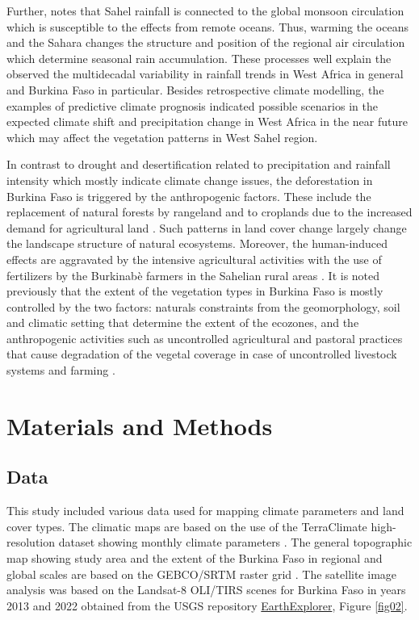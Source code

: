 \documentclass[atmosphere,article,submit,pdftex,moreauthors]{Definitions/mdpi}
\begin{document}
Further, \cite{Biasutti} notes that Sahel rainfall is connected to the global monsoon circulation which is susceptible to the effects from remote oceans. Thus, warming the oceans and the Sahara changes the structure and position of the regional air circulation which determine seasonal rain accumulation. These processes well explain the observed the multidecadal variability in rainfall trends in West Africa in general and Burkina Faso in particular. Besides retrospective climate modelling, the examples of predictive climate prognosis \cite{Gaetani} indicated possible scenarios in the expected climate shift and precipitation change in West Africa in the near future which may affect the vegetation patterns in West Sahel region. 

In contrast to drought and desertification related to precipitation and rainfall intensity which mostly indicate climate change issues, the deforestation in Burkina Faso is triggered by the anthropogenic factors. These include the replacement of natural forests by rangeland and to croplands due to the increased demand for agricultural land \cite{ETONGO201551}. Such patterns in land cover change largely change the landscape structure of natural ecosystems. Moreover, the human-induced effects are aggravated by the intensive agricultural activities with the use of fertilizers by the Burkinabè farmers in the Sahelian rural areas \cite{agronomy11122431}. It is noted previously that the extent of the vegetation types in Burkina Faso is mostly controlled by the two factors: naturals constraints from the geomorphology, soil and climatic setting that determine the extent of the ecozones, and the anthropogenic activities such as uncontrolled agricultural and pastoral practices that cause degradation of the vegetal coverage in case of uncontrolled livestock systems and farming \cite{Bandre}. 

\section{Materials and Methods}

\subsection{Data}
This study included various data used for mapping climate parameters and land cover types. The climatic maps are based on the use of the TerraClimate high-resolution dataset showing monthly climate parameters \cite{Abatzoglou}. The general topographic map showing study area and the extent of the Burkina Faso in regional and global scales are based on the GEBCO/SRTM raster grid \cite{GEBCO}. The satellite image analysis was based on the Landsat-8 OLI/TIRS scenes \cite{USGS} for Burkina Faso in years 2013 and 2022 obtained from the USGS repository \href{https://earthexplorer.usgs.gov/}{EarthExplorer}, Figure \ref{fig02}. 
\end{document}
